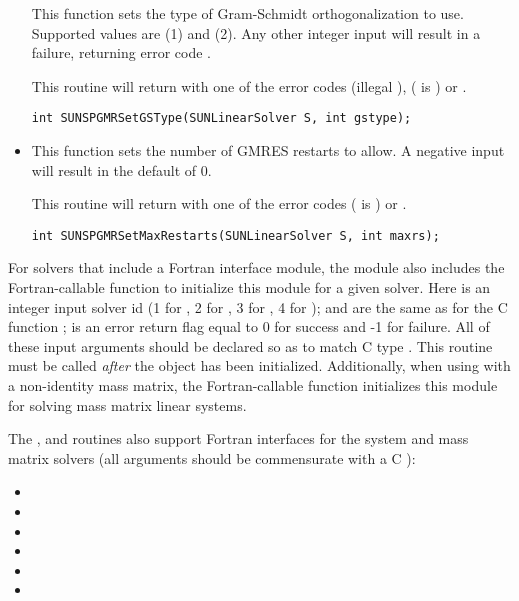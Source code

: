 \begin{itemize}
  This function sets the type of Gram-Schmidt orthogonalization to
  use.  Supported values are  (1) and
   (2).  Any other integer input will result in a
  failure, returning error code .

  This routine will return with one of the error codes
   (illegal ), 
  ( is ) or .
  
  \verb|int SUNSPGMRSetGSType(SUNLinearSolver S, int gstype);|



\item {}

  This function sets the number of GMRES restarts to 
  allow.  A negative input will result in the default of 0.

  This routine will return with one of the error codes
   ( is ) or .
  
  \verb|int SUNSPGMRSetMaxRestarts(SUNLinearSolver S, int maxrs);|

\end{itemize}
For solvers that include a Fortran interface module, the
{\sunlinsolspgmr} module also includes the Fortran-callable
function  to initialize
this {\sunlinsolspgmr} module for a given {\sundials} solver.
Here  is an integer input solver id (1 for {\cvode}, 2 for {\ida}, 3
for {\kinsol}, 4 for {\arkode});  and  are the
same as for the C function ;  is an error return
flag equal to 0 for success and -1 for failure.  All of these input
arguments should be declared so as to match C type .  This
routine must be called \emph{after} the {\nvector} object has been
initialized.  Additionally, when using {\arkode} with a non-identity
mass matrix, the Fortran-callable
function  initializes this 
{\sunlinsolspgmr} module for solving mass matrix linear systems.

The ,  and
 routines also support Fortran interfaces
for the system and mass matrix solvers (all arguments should be
commensurate with a C ):
\begin{itemize}
\item {}
\item {}
\item {}
\item {}
\item {}
\item {}
\end{itemize}
